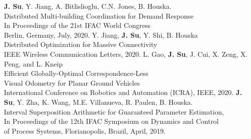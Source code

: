 \documentclass[margin]{res}
\begin{document}
\begin{resume}
{} %

    
{
  \newline
  \textbf{J. Su}, Y. Jiang, A. Bitlislioglu, C.N. Jones, B. Houska. 
  \\Distributed Multi-building Coordination for Demand Response 
  \\ In Proceedings of the 21st IFAC World Congress 
  \\ Berlin, Germany, July, 2020.
  \newline \newline
  Y. Jiang, \textbf{J. Su}, Y. Shi, B. Houska
  \\Distributed Optimization for Massive Connectivity
  \\ IEEE Wireless Communication Letters, 2020. 
  \newline \newline
  L. Gao, \textbf{J. Su}, J. Cui, X. Zeng, X. Peng, and L. Kneip
  \\ Efficient Globally-Optimal Correspondence-Less 
  \\ Visual Odometry for Planar Ground Vehicles  
  \\ International Conference on Robotics and Automation (ICRA), IEEE, 2020. 
  \newline \newline
  \textbf{J. Su}, Y. Zha, K. Wang, M.E. Villanueva, R. Paulen, B. Houska. 
  \\Interval Superposition Arithmetic for Guaranteed Parameter Estimation,
  \\In Proceedings of the 12th IFAC Symposium on Dynamics and Control 
  \\of Process Systems, Florianopolis, Brazil, April, 2019.
}%
    

\end{resume}
\end{document}
